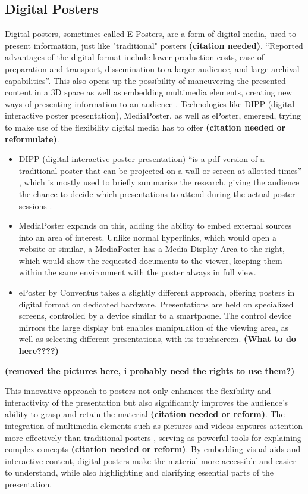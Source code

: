 \subsection{Digital Posters}
Digital posters, sometimes called E-Posters, are a form of digital media, used to present information, just like "traditional" posters \textbf{(citation needed)}. \enquote{Reported advantages of the digital format include lower production costs, ease of preparation and transport, dissemination to a larger audience, and large archival capabilities}\cite{Newsom.2021}. This also opens up the possibility of maneuvering the presented content in a 3D space as well as embedding multimedia elements, creating new ways of presenting information to an audience \cite{Venkatesan.2019}. Technologies like DIPP (digital interactive poster presentation)\cite{Simone.2001}, MediaPoster\cite{Rowe}, as well as ePoster, emerged, trying to make use of the flexibility digital media has to offer \textbf{(citation needed or reformulate)}. \\
\begin{itemize}
	\item DIPP (digital interactive poster presentation) \enquote{is a pdf version of a traditional poster that can be projected on a wall or screen at allotted times} \cite{Angelo}, which is mostly used to briefly summarize the research, giving the audience the chance to decide which presentations to attend during the actual poster sessions \cite{Angelo}.
	\item MediaPoster expands on this, adding the ability to embed external sources into an area of interest. Unlike normal hyperlinks, which would open a website or similar, a MediaPoster has a Media Display Area to the right, which would show the requested documents to the viewer, keeping them within the same environment with the poster always in full view. \cite{Rowe}
	\item ePoster by Conventus takes a slightly different approach, offering posters in digital format on dedicated hardware. Presentations are held on specialized screens, controlled by a device similar to a smartphone. The control device mirrors the large display but enables manipulation of the viewing area, as well as selecting different presentations, with its touchscreen. \textbf{(What to do here????)}
\end{itemize}	
\textbf{(removed the pictures here, i probably need the rights to use them?)}

This innovative approach to posters not only enhances the flexibility and interactivity of the presentation but also significantly improves the audience's ability to grasp and retain the material \textbf{(citation needed or reform)}. The integration of multimedia elements such as pictures and videos captures attention more effectively than traditional posters \cite{Sumantri}, serving as powerful tools for explaining complex concepts \textbf{(citation needed or reform)}. By embedding visual aids and interactive content, digital posters make the material more accessible and easier to understand, while also highlighting and clarifying essential parts of the presentation\cite{Sumantri}.

